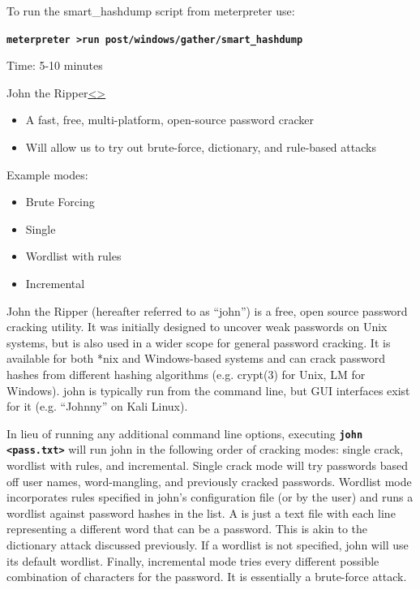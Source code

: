 \documentclass[12pt]{article}
\newcommand{\code}[1]{\texttt{\bfseries#1}}
\newenvironment{instructionblock}{\Large\bgroup}{\egroup}
\newcommand{\bi}{\begin{itemize}}
\newcommand{\ei}{\end{itemize}}
\begin{document}
To run the smart\_hashdump script from meterpreter use:

\code{meterpreter \textgreater run post/windows/gather/smart\_hashdump}

\vfill 

Time: 5-10 minutes

\pagebreak
\begin{slide}{John the Ripper}{\hyperref[slide 10]{\textless}\hyperref[slide 12]{\textgreater}}
	\begin{instructionblock}
		\bi 
			\item A fast, free, multi-platform, open-source password cracker
			\item Will allow us to try out brute-force, dictionary, and rule-based attacks
		\ei 
		Example modes:
		\bi
			\item Brute Forcing
			\item Single
			\item Wordlist with rules
			\item Incremental
		\ei
	\end{instructionblock}
\end{slide}
\vfill

John the Ripper (hereafter referred to as ``john'') is a free, open source password cracking utility. It was initially designed to uncover weak passwords on Unix systems, but is also used in a wider scope for general password cracking. It is available for both *nix and Windows-based systems and can crack password hashes from different hashing algorithms (e.g. crypt(3) for Unix, LM for Windows). \cite{john} john is typically run from the command line, but GUI interfaces exist for it (e.g. ``Johnny'' on Kali Linux).

In lieu of running any additional command line options, executing \code{john \textless pass.txt\textgreater} will run john in the following order of cracking modes: single crack, wordlist with rules, and incremental. Single crack mode will try passwords based off user names, word-mangling, and previously cracked passwords. Wordlist mode incorporates rules specified in john's configuration file (or by the user) and runs a wordlist against password hashes in the list. A  is just a text file with each line representing a different word that can be a password. This is akin to the dictionary attack discussed previously. If a wordlist is not specified, john will use its default wordlist. Finally, incremental mode tries every different possible combination of characters for the password. It is essentially a brute-force attack. \cite{john}
\end{document}
